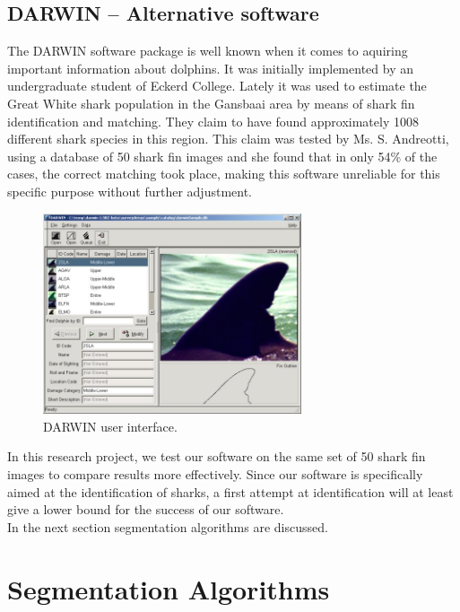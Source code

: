 \documentclass[a4paper,10pt]{article}
\begin{document}
\subsection{DARWIN -- Alternative software}
The DARWIN\cite{Darwin} software package is well known when it comes to
aquiring important information about dolphins.  It was initially implemented
by an undergraduate student of
Eckerd College.
Lately it was used to estimate the Great White shark population in the
Gansbaai area by means of shark fin identification and matching.  They claim to
have found approximately
1008 different shark species in this region.  This
claim was tested by Ms. S. Andreotti, using a database of 50 shark fin images and she found that in only
54\% of the cases, the correct matching took place, making this software
unreliable for this specific purpose without further adjustment.

\begin{figure}[H]
 \centering
 \includegraphics[width=3in]{Darwin.jpg}
 \caption{DARWIN user interface. \cite{Darwin}}
\end{figure}

In this research project, we test our software on the same set of 50 shark fin
images to compare results more effectively.
Since our software is specifically aimed at the identification of sharks, a first attempt at identification will at least 
give a lower bound for the success of our software. \\

In the next section segmentation algorithms are discussed.  

\newpage
\section{Segmentation Algorithms}
\end{document}
